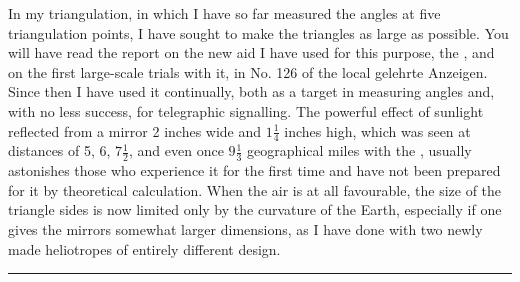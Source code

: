 \par\noindent\hspace*{\parindent}In my triangulation, in which I have so far measured the angles at five triangulation points, I have sought to make the triangles as large as possible. You will have read the report on the new aid I have used for this purpose, the , and on the first large-scale trials with it, in No. 126 of the local gelehrte Anzeigen. Since then I have used it continually, both as a target in measuring angles and, with no less success, for telegraphic signalling. The powerful effect of sunlight reflected from a mirror 2 inches wide and $1\frac14$ inches high, which was seen at distances of 5, 6, $7\frac12$, and even once $9\frac13$ geographical miles with the , usually astonishes those who experience it for the first time and have not been prepared for it by theoretical calculation. When the air is at all favourable, the size of the triangle sides is now limited only by the curvature of the Earth, especially if one gives the mirrors somewhat larger dimensions, as I have done with two newly made heliotropes of entirely different design.
\begin{center}\rule{3.5cm}{.4pt}\end{center}

